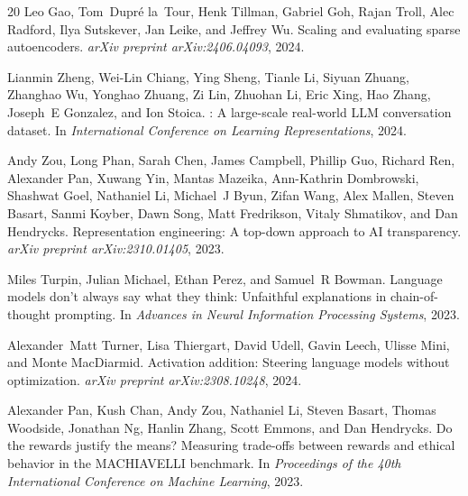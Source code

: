 \documentclass[10pt,twocolumn]{article}
\begin{document}
\begin{thebibliography}{20}
Leo Gao, Tom~Dupr\'e la~Tour, Henk Tillman, Gabriel Goh, Rajan Troll, Alec Radford, Ilya Sutskever, Jan Leike, and Jeffrey Wu.
\newblock Scaling and evaluating sparse autoencoders.
\newblock \emph{arXiv preprint arXiv:2406.04093}, 2024.

Lianmin Zheng, Wei-Lin Chiang, Ying Sheng, Tianle Li, Siyuan Zhuang, Zhanghao Wu, Yonghao Zhuang, Zi Lin, Zhuohan Li, Eric Xing, Hao Zhang, Joseph~E Gonzalez, and Ion Stoica.
: A large-scale real-world {LLM} conversation dataset.
\newblock In \emph{International Conference on Learning Representations}, 2024.

Andy Zou, Long Phan, Sarah Chen, James Campbell, Phillip Guo, Richard Ren, Alexander Pan, Xuwang Yin, Mantas Mazeika, Ann-Kathrin Dombrowski, Shashwat Goel, Nathaniel Li, Michael~J Byun, Zifan Wang, Alex Mallen, Steven Basart, Sanmi Koyber, Dawn Song, Matt Fredrikson, Vitaly Shmatikov, and Dan Hendrycks.
\newblock Representation engineering: A top-down approach to {AI} transparency.
\newblock \emph{arXiv preprint arXiv:2310.01405}, 2023.

Miles Turpin, Julian Michael, Ethan Perez, and Samuel~R Bowman.
\newblock Language models don't always say what they think: Unfaithful explanations in chain-of-thought prompting.
\newblock In \emph{Advances in Neural Information Processing Systems}, 2023.

Alexander~Matt Turner, Lisa Thiergart, David Udell, Gavin Leech, Ulisse Mini, and Monte MacDiarmid.
\newblock Activation addition: Steering language models without optimization.
\newblock \emph{arXiv preprint arXiv:2308.10248}, 2024.

Alexander Pan, Kush Chan, Andy Zou, Nathaniel Li, Steven Basart, Thomas Woodside, Jonathan Ng, Hanlin Zhang, Scott Emmons, and Dan Hendrycks.
\newblock Do the rewards justify the means? {M}easuring trade-offs between rewards and ethical behavior in the {MACHIAVELLI} benchmark.
\newblock In \emph{Proceedings of the 40th International Conference on Machine Learning}, 2023.


\end{thebibliography}
\end{document}

